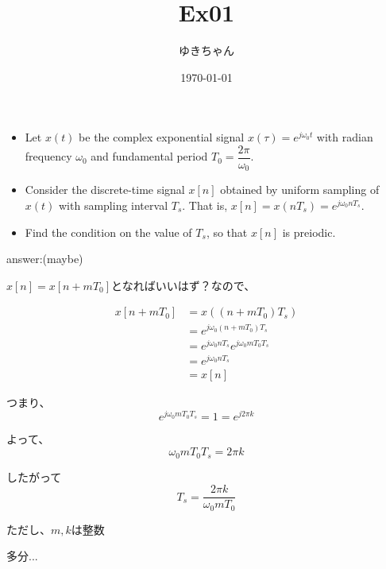 \documentclass[a4paper,16pt]{jsarticle}
\title{Ex01}
\author{ゆきちゃん}
\date{\today}
\begin{document}
\maketitle


\begin{itemize}
	\item Let $x(t)$ be the complex exponential signal $x(\tau) = e^{j\omega_0 t}$ with radian frequency $\omega_0$ and fundamental period $T_0 = \dfrac{2\pi}{\omega_0}$.
	\item Consider the discrete-time signal $x[n]$ obtained by uniform sampling of $x(t)$ with sampling interval $T_s$. That is, $x[n] = x(nT_s) = e^{j\omega_0 n T_s}$.
	\item Find the condition on the value of $T_s$, so that $x[n]$ is preiodic.
\end{itemize}

answer:(maybe)

$x[n] = x[n + mT_0]$となればいいはず？なので、

\begin{align}
	x[n + mT_0]
	&= x((n+mT_0)T_s) \\
	&= e^{j\omega_0(n+mT_0)T_s} \\
	&= e^{j\omega_0nT_s}e^{j\omega_0mT_0T_s} \\
	&= e^{j\omega_0nT_s} \\
	&= x[n]
\end{align}

つまり、
\begin{equation}
	e^{j\omega_0mT_0T_s} = 1 = e^{j2\pi k}
\end{equation}

よって、
\begin{equation}
	\omega_0mT_0T_s = 2\pi k
\end{equation}

したがって
\begin{equation}
	T_s = \dfrac{2\pi k}{\omega_0mT_0}
\end{equation}

ただし、$m,k$は整数

多分...
\end{document}

